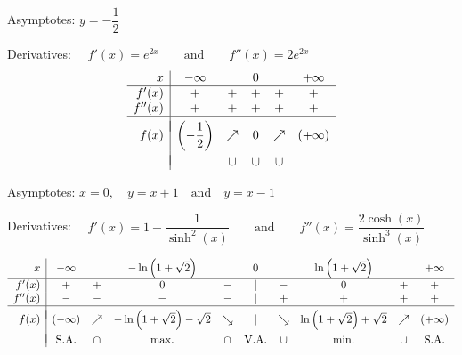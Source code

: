\begin{Answer}
    
        \Question Asymptotes: \quad $y=-\dfrac{1}{2}$\par
            Derivatives: $\quad f'(x)=e^{2x}\qquad\mbox{and}\qquad f''(x)=2e^{2x}$
            \[ \begin{array}{r|ccccc}
            x & -\infty & & 0 & &+\infty \\
            \hline
            f'(x)   & + & + & + & + & +\\
            f''(x)  & + & + & + & + & +\\
            \hline
            &&&&&\vspace{-0.3cm}\\
            f(x)    & \left(-\dfrac{1}{2}\right) & \nearrow & 0 & \nearrow & (+\infty)\\
            &&&&&\vspace{-0.3cm}\\                                                                              
                    & & \cup & \cup & \cup \\
            \end{array}\]
    
    
        \Question Asymptotes: \quad $x=0,\quad y=x+1\quad\mbox{and}\quad y=x-1$\par
            Derivatives: $\quad f'(x)=1-\dfrac{1}{\sinh^2 (x)}\qquad\mbox{and}\qquad f''(x)=\dfrac{2\cosh (x)}{\sinh^3(x)}$
            \begin{footnotesize}\[ \begin{array}{r|ccccccccc}
            x & -\infty & & -\ln \left(1+\sqrt{2}\right) &  & 0 & & \ln \left(1+\sqrt{2}\right) & &+\infty \\[0.1cm]
            \hline
            f'(x)   & + & + & 0 & - & | & - & 0 & + & +\\
            f''(x)  & - & - & - & - & | & + & + & + & +\\
            \hline
            &&&&&&&&&\vspace{-0.3cm}\\
            f(x)    & (-\infty) & \nearrow & -\ln\left(1+\sqrt{2}\right) - \sqrt{2} & \searrow & | & \searrow & \ln\left(1+\sqrt{2}\right) + \sqrt{2} & \nearrow & (+\infty)\\
            &&&&&&&&&\vspace{-0.3cm}\\                                                                              
                    & \mbox{S.A.} & \cap & \mbox{max.} & \cap & \mbox{V.A.} & \cup & \mbox{min.} & \cup & \mbox{S.A.} \\
            \end{array}\]\end{footnotesize}
    

\end{Answer}
